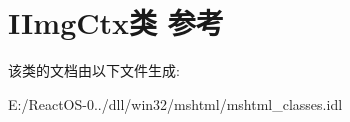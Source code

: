 \hypertarget{class_i_img_ctx}{}\section{I\+Img\+Ctx类 参考}
\label{class_i_img_ctx}


该类的文档由以下文件生成\+:\begin{DoxyCompactItemize}
\item 
E\+:/\+React\+O\+S-\/0../dll/win32/mshtml/mshtml\+\_\+classes.\+idl\end{DoxyCompactItemize}
